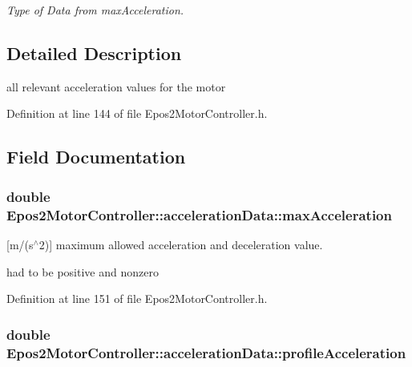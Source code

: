 \begin{DoxyCompactItemize}
\begin{DoxyCompactList}\small\item\em Type of Data from max\-Acceleration. \end{DoxyCompactList}\end{DoxyCompactItemize}


\subsection{Detailed Description}
all relevant acceleration values for the motor 

Definition at line 144 of file Epos2\-Motor\-Controller.\-h.



\subsection{Field Documentation}
\hypertarget{structEpos2MotorController_1_1accelerationData_a96bc503d21b47c531df12406a9a80f24}{
\subsubsection[{max\-Acceleration}]{\setlength{\rightskip}{0pt plus 5cm}double Epos2\-Motor\-Controller\-::acceleration\-Data\-::max\-Acceleration}}\label{structEpos2MotorController_1_1accelerationData_a96bc503d21b47c531df12406a9a80f24}


\mbox{[}m/(s$^\wedge$2)\mbox{]} maximum allowed acceleration and deceleration value. 

had to be positive and nonzero 

Definition at line 151 of file Epos2\-Motor\-Controller.\-h.

\hypertarget{structEpos2MotorController_1_1accelerationData_a7d5e951aef62b34f0cda8ab6f2233b35}{
\subsubsection[{profile\-Acceleration}]{\setlength{\rightskip}{0pt plus 5cm}double Epos2\-Motor\-Controller\-::acceleration\-Data\-::profile\-Acceleration}}\label{structEpos2MotorController_1_1accelerationData_a7d5e951aef62b34f0cda8ab6f2233b35}



